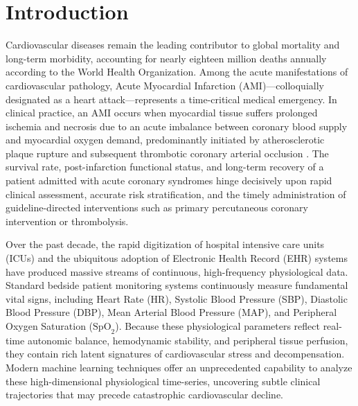 \chapter{Introduction}
\label{ch:introduction}

Cardiovascular diseases remain the leading contributor to global mortality and long-term morbidity, accounting for nearly eighteen million deaths annually according to the World Health Organization. Among the acute manifestations of cardiovascular pathology, Acute Myocardial Infarction (AMI)—colloquially designated as a heart attack—represents a time-critical medical emergency. In clinical practice, an AMI occurs when myocardial tissue suffers prolonged ischemia and necrosis due to an acute imbalance between coronary blood supply and myocardial oxygen demand, predominantly initiated by atherosclerotic plaque rupture and subsequent thrombotic coronary arterial occlusion \citep{thygesen2018fourth}. The survival rate, post-infarction functional status, and long-term recovery of a patient admitted with acute coronary syndromes hinge decisively upon rapid clinical assessment, accurate risk stratification, and the timely administration of guideline-directed interventions such as primary percutaneous coronary intervention or thrombolysis.

Over the past decade, the rapid digitization of hospital intensive care units (ICUs) and the ubiquitous adoption of Electronic Health Record (EHR) systems have produced massive streams of continuous, high-frequency physiological data. Standard bedside patient monitoring systems continuously measure fundamental vital signs, including Heart Rate (HR), Systolic Blood Pressure (SBP), Diastolic Blood Pressure (DBP), Mean Arterial Blood Pressure (MAP), and Peripheral Oxygen Saturation ($\text{SpO}_2$). Because these physiological parameters reflect real-time autonomic balance, hemodynamic stability, and peripheral tissue perfusion, they contain rich latent signatures of cardiovascular stress and decompensation. Modern machine learning techniques offer an unprecedented capability to analyze these high-dimensional physiological time-series, uncovering subtle clinical trajectories that may precede catastrophic cardiovascular decline.

